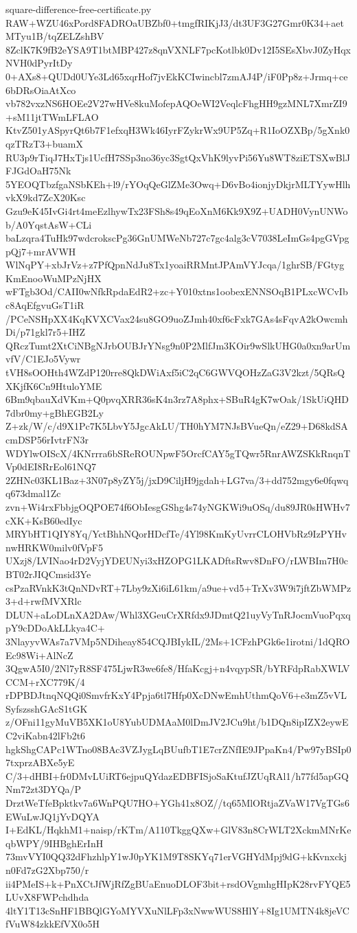\documentclass[11pt]{article}
\theoremstyle{definition}
\theoremstyle{remark}
\begin{document}
\begin{filecontents*}[overwrite]{square-difference-free-certificate.py}
RAW+WZU46xPord8FADROaUBZbf0+tmgfRIKjJ3/dt3UF3G27Gmr0K34+aetMTyu1B/tqZELZshBV
8ZclK7K9fB2eYSA9T1btMBP427z8qnVXNLF7pcKotlbk0Dv12I5SEsXbvJ0ZyHqxNVH0dPyrItDy
0+AXs8+QUDd0UYe3Ld65xqrHof7jvEkKCIwincbl7zmAJ4P/iF0Pp8z+Jrmq+ce6bDRsOiaAtXco
vb782vxzNS6HOEe2V27wHVe8kuMofepAQOeWI2VeqlcFhgHH9gzMNL7XmrZI9+sM11jtTWmLFLAO
KtvZ501yASpyrQt6b7F1efxqH3Wk46IyrFZykrWx9UP5Zq+R1IoOZXBp/5gXnk0qzTRzT3+buamX
RU3p9rTiqJ7HxTjs1UcfH7SSp3no36yc3SgtQxVhK9lyvPi56Yu8WT8ziETSXwBlJFJGdOaH75Nk
5YEOQTbzfgaNSbKEh+l9/rYOqQeGlZMe3Owq+D6vBo4ionjyDkjrMLTYywHlhvkX9kd7ZcX20Ksc
Gzu9eK45IvGi4rt4meEzlhywTx23FSh8s49qEoXnM6Kk9X9Z+UADH0VynUNWob/A0YqstAsW+CLi
baLzqra4TuHk97wdcrokscPg36GnUMWeNb727c7gc4alg3cV7038LeImGs4pgGVpgpQj7+mrAVWH
WlNqPY+xbJrVz+z7PfQpnNdJu8Tx1yoaiRRMntJPAmVYJcqa/1ghrSB/FGtygKmEnooWuMPzNjHX
wFTgb3Od/CAII0wNfkRpdaEdR2+zc+Y010xtns1oobexENNSOqB1PLxcWCvIbc8AqEfgvuGsT1iR
/PCeNSHpXX4KqKVXCVax24su8GO9uoZJmh40xf6cFxk7GAs4sFqvA2kOwcmhDi/p71gkl7r5+IHZ
QRczTumt2XtCiNBgNJrbOUBJrYNsg9n0P2MlfJm3KOir9wSlkUHG0a0xn9arUmvfV/C1EJo5Vywr
tVH8sOOHth4WZdP120rre8QkDWiAxf5iC2qC6GWVQOHzZaG3V2kzt/5QRsQXKjfK6Cn9HtuloYME
6Bm9qbauXdVKm+Q0pvqXRR36sK4n3rz7A8phx+SBuR4gK7wOak/1SkUiQHD7dbr0my+gBhEGB2Ly
Z+zk/W/c/d9X1Pc7K5LbvY5JgcAkLU/TH0hYM7NJsBVueQn/eZ29+D68kdSAcmDSP56rIvtrFN3r
WDYlwOIScX/4KNrrra6bSReROUNpwF5OrcfCAY5gTQwr5RnrAWZSKkRnqnTVp0dEI8RrEol61NQ7
2ZHNc03KL1Baz+3N07p8yZY5j/jxD9CiljH9jgdah+LG7va/3+dd752mgy6e0fqwqq673dmal1Zc
zvn+Wi4rxFbbjgOQPOE74f6ObIesgGShg4s74yNGKWi9uOSq/du89JR0sHWHv7cXK+KsB60edIyc
MRYbHT1QIY8Yq/YctBhhNQorHDcfTe/4Yl98KmKyUvrrCLOHVbRz9IzPYHvnwHRKW0milv0fVpF5
UXzj8/LVINao4rD2VyjYDEUNyi3xHZOPG1LKADftsRwv8DnFO/rLWBIm7H0cBT02rJIQCmsid3Ye
csPzaRVnkK3tQnNDvRT+7Lby9zXi6iL61km/a9ue+vd5+TrXv3W9i7jftZbWMPz3+d+rwfMVXRlc
DLUN+aLoDLnXA2DAw/Whl3XGeuCrXRfdx9JDmtQ21uyVyTnRJocmVuoPqxqpY9cDDoAkLLkya4C+
3NlayyvWAs7a7VMp5NDiheay854CQJBIykIL/2Ms+1CFzhPGk6e1irotni/1dQROEc98Wi+AlNcZ
3QgwA5I0/2Nl7yR8SF475LjwR3we6fe8/HfaKcgj+n4vqypSR/bYRFdpRabXWLVCCM+rXC779K/4
rDPBDJtnqNQQi0SmvfrKxY4Ppja6tl7Hfp0XcDNwEmhUthmQoV6+e3mZ5vVLSyfszsshGAcS1tGK
z/OFni11gyMuVB5XK1oU8YubUDMAaM0lDmJV2JCu9ht/b1DQn8ipIZX2eywEC2viKabn42lFb2t6
hgkShgCAPc1WTno08BAc3VZJygLqBUufbT1E7crZNfIE9JPpaKn4/Pw97yBSIp07txprzABXe5yE
C/3+dHBI+fr0DMvLUiRT6ejpuQYdazEDBFISjoSaKtufJZUqRAl1/h77fd5apGQNm72zt3DYQa/P
DrztWeTfeBpktkv7a6WnPQU7HO+YGh41x8OZ//tq65MlORtjaZVaW17VgTGs6EWuLwJQ1jYvDQYA
I+EdKL/HqkhM1+naisp/rKTm/A110TkggQXw+GlV83n8CrWLT2XckmMNrKeqbWPY/9IHBghErInH
73mvVYI0QQ32dFhzhlpY1wJ0pYK1M9T8SKYq71erVGHYdMpj9dG+kKvnxckjn0Fd7zG2Xbp750/r
ii4PMeIS+k+PnXCtJfWjRfZgBUaEnuoDLOF3bit+rsdOVgmhgHIpK28rvFYQE5LUvX8FWPchdhda
4ltY1T13cSnHF1BBQlGYoMYVXuNlLFp3xNwwWUS8HlY+8Ig1UMTN4k8jeVCfVuW84zkkEfVX0o5H

\end{filecontents*}
\end{document}
